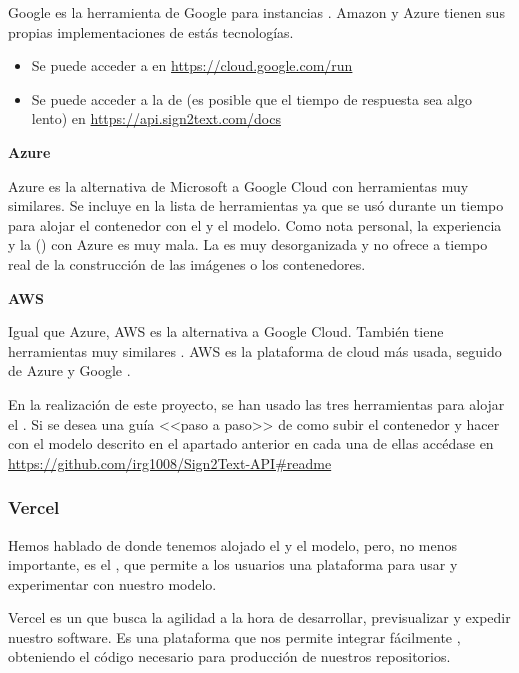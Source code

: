 Google  es la herramienta de Google para instancias . Amazon y Azure tienen sus propias implementaciones de estás tecnologías.

\begin{itemize}
  \item Se puede acceder a  en \url{https://cloud.google.com/run}
  \item Se puede acceder a la  de  (es posible que el tiempo de respuesta sea algo lento) en \url{https://api.sign2text.com/docs}
\end{itemize}

\textbf{Azure}

Azure es la alternativa de Microsoft a Google Cloud con herramientas muy similares. Se incluye en la lista de herramientas ya que se usó durante un tiempo para alojar el contenedor con el  y el modelo. Como nota personal, la experiencia y la  () con Azure es muy mala. La  es muy desorganizada y no ofrece  a tiempo real de la construcción de las imágenes o los contenedores.

\textbf{AWS}

Igual que Azure, AWS es la alternativa a Google Cloud. También tiene herramientas muy similares . AWS es la plataforma de cloud más usada, seguido de Azure y Google .

En la realización de este proyecto, se han usado las tres herramientas para alojar el . Si se desea una guía <<paso a paso>> de como subir el contenedor y hacer  con el modelo descrito en el apartado anterior en cada una de ellas accédase en \url{https://github.com/irg1008/Sign2Text-API#readme}

\subsubsection{Vercel}

Hemos hablado de donde tenemos alojado el  y el modelo, pero, no menos importante, es el , que permite a los usuarios una plataforma para usar y experimentar con nuestro modelo.

Vercel es un  que busca la agilidad a la hora de desarrollar, previsualizar y expedir nuestro software. Es una plataforma que nos permite integrar fácilmente , obteniendo el código necesario para producción de nuestros repositorios.


